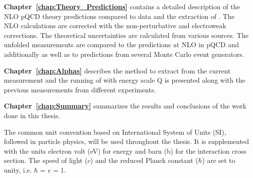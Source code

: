 {\bf Chapter~\ref{chap:Theory_Predictions}} contains a detailed description of the NLO pQCD theory predictions compared to data and the extraction of \alps. The NLO calculations are corrected with the non-perturbative and electroweak corrections. The theoretical uncertainties are calculated from various sources. The unfolded measurements are compared to the predictions at NLO in pQCD and additionally as well as to predictions from several Monte Carlo event generators.

{\bf Chapter~\ref{chap:Alphas}} describes the method to extract \alpsmz from the current measurement and the running of \alps with energy scale Q is presented along with the previous measurements from different experiments.

{\bf Chapter~\ref{chap:Summary}} summarizes the results and conclusions of the work done in this thesis.

The common unit convention based on International System of Units (SI), followed in particle physics, will be used throughout the thesis. It is supplemented with the units electron volt (eV) for energy and barn (b) for the interaction cross section. The speed of light ($c$) and the reduced Planck constant ($\hbar$) are set to unity, i.e. $\hbar$ = c = 1.
